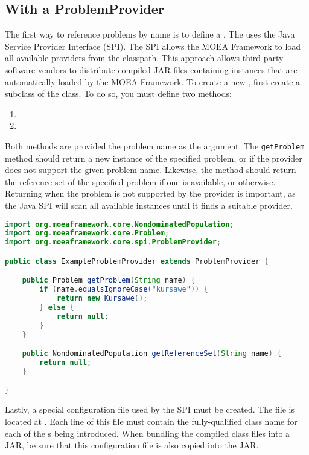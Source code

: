 \subsection{With a ProblemProvider}
The first way to reference problems by name is to define a .  The  uses the Java Service Provider Interface (SPI).  The SPI allows the MOEA Framework to load all available providers from the classpath.  This approach allows third-party software vendors to distribute compiled JAR files containing  instances that are automatically loaded by the MOEA Framework.  To create a new , first create a subclass of the  class.  To do so, you must define two methods:
\begin{enumerate}
  \item {}
  \item {}
\end{enumerate}

Both methods are provided the problem name as the argument.  The \texttt{getProblem} method should return a new instance of the specified problem, or  if the provider does not support the given problem name.  Likewise, the  method should return the reference set of the specified problem if one is available, or  otherwise.  Returning  when the problem is not supported by the provider is important, as the Java SPI will scan all available  instances until it finds a suitable provider.

\begin{lstlisting}[language=Java]
import org.moeaframework.core.NondominatedPopulation;
import org.moeaframework.core.Problem;
import org.moeaframework.core.spi.ProblemProvider;

public class ExampleProblemProvider extends ProblemProvider {

	public Problem getProblem(String name) {
		if (name.equalsIgnoreCase("kursawe")) {
			return new Kursawe();
		} else {
			return null;
		}
	}

	public NondominatedPopulation getReferenceSet(String name) {
		return null;
	}

}
\end{lstlisting}

Lastly, a special configuration file used by the SPI must be created.  The file is located at .  Each line of this file must contain the fully-qualified class name for each of the s being introduced.  When bundling the compiled class files into a JAR, be sure that this configuration file is also copied into the JAR.

